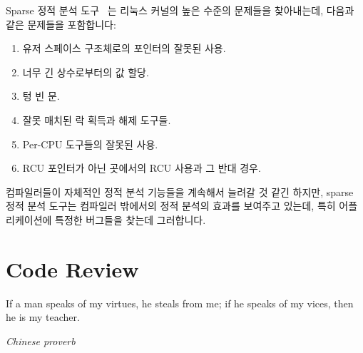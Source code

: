 Sparse 정적 분석 도구~\cite{JonathanCorbet2004sparse} 는 리눅스 커널의 높은
수준의 문제들을 찾아내는데, 다음과 같은 문제들을 포함합니다:

\begin{enumerate}
\item	유저 스페이스 구조체로의 포인터의 잘못된 사용.
\item	너무 긴 상수로부터의 값 할당.
\item	텅 빈  문.
\item	잘못 매치된 락 획득과 해제 도구들.
\item	Per-CPU 도구들의 잘못된 사용.
\item	RCU 포인터가 아닌 곳에서의 RCU 사용과 그 반대 경우.

\end{enumerate}

컴파일러들이 자체적인 정적 분석 기능들을 계속해서 늘려갈 것 같긴 하지만, sparse
정적 분석 도구는 컴파일러 밖에서의 정적 분석의 효과를 보여주고 있는데, 특히
어플리케이션에 특정한 버그들을 찾는데 그러합니다.

\section{Code Review}
\label{sec:debugging:Code Review}
%
\epigraph{If a man speaks of my virtues, he steals from me;
	  if he speaks of my vices, then he is my teacher.}
	 {\emph{Chinese proverb}}


